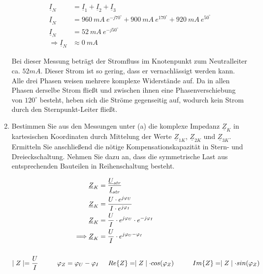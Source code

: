 \begin{enumerate}[label=\alph*)]
	 		\begin{align*}
	 			\underline{I}_{N} &= \underline{I}_{1}+\underline{I}_{2}+\underline{I}_{3} \\
	 			\underline{I}_{N} &= 960\ mA\ e^{-j70^\circ} + 900\ mA\ e^{170^\circ} + 920\ mA\ e^{50^\circ} \\
	 			\underline{I}_{N} &= 52\ mA\ e^{-j50^\circ} \\
 				\Longrightarrow\underline{I}_{N} &\approx 0\ mA
	 		\end{align*}
	 		
	 		
	 		Bei dieser Messung beträgt der Stromfluss im Knotenpunkt zum Neutralleiter ca. $52 mA$. Dieser Strom ist so gering, dass er vernachlässigt werden kann. Alle drei Phasen weisen mehrere komplexe Widerstände auf. Da in allen Phasen derselbe Strom fließt und zwischen ihnen eine Phasenverschiebung von $120^\circ$ besteht, heben sich die Ströme gegenseitig auf, wodurch kein Strom durch den Sternpunkt-Leiter fließt.
	 		
	 		\item Bestimmen Sie aus den Messungen unter (a) die komplexe Impedanz $\underline{Z}_{K}$ in kartesischen Koordinaten durch Mittelung der Werte $\underline{Z}_{1K}$, $\underline{Z}_{2K}$ und $\underline{Z}_{3K}$. Ermitteln Sie anschließend die nötige Kompensationskapazität in Stern- und Dreieckschaltung. Nehmen Sie dazu an, dass die symmetrische Last aus entsprechenden Bauteilen in Reihenschaltung besteht.
	 		
	 		\begin{align*}
	 			\underline{Z}_{K} &= \frac{\underline{U}_{str}}{\underline{I}_{str}}\\
	 			\underline{Z}_{K} &= \frac{U\cdot  e^{j\varphi _{U}}}{I\cdot  e^{j\varphi _{I}}}\\
	 			\underline{Z}_{K} &= \frac{U}{I} \cdot  e^{j\varphi _{U}}\cdot e^{-j\varphi _{I}}\\
	 			\Longrightarrow\underline{Z}_{K} &= \frac{U}{I} \cdot  e^{j{\varphi _{U} - \varphi _{I}}} \\ \ \\
	 			\mid Z \mid			= \frac{U}{I} \hspace{1cm}
	 			\varphi _{Z} 		= {\varphi _{U} - \varphi _{I}}
	 			&\hspace{0.5cm}
	 			Re\{Z\} 			= \mid Z \mid \cdot cos(\varphi _{Z}) \hspace{1cm}
	 			Im\{Z\} 			= \mid Z \mid \cdot sin(\varphi _{Z})\\
	 		\end{align*}
	 		

\end{enumerate}
